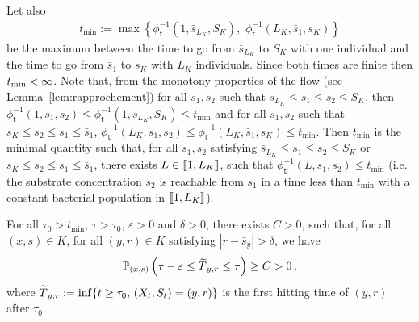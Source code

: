\documentclass[AHL,Unicode,longabstracts,published]{cedram}
\newcommand{\llbracket}{\mathopen{[\mkern -2.7mu[}}
\newcommand{\rrbracket}{\mathclose{]\mkern -2.7mu]}}
\newcommand{\PP}{\mathbb{P}}
\newcommand{\SminK}{s_K}
\newcommand{\SmaxK}{S_K}
\newcommand{\phit}{\phi_\textsf{t}^{-1}}
\newcommand{\lmax}{{L_K}}
\newcommand{\setunlmax}{\llbracket 1, \lmax\rrbracket}
\newcommand{\1}{\mathbf{1}}
\let\oldtilde\tilde
\renewcommand*{\tilde}[1]{\mathchoice{\widetilde{#1}}{\widetilde{#1}}{\oldtilde{#1}}{\oldtilde{#1}}}
\begin{document}
Let also
\begin{align}\label{def:tmin}
t_{\min}:= \max\left\{\phit\left(1,\bar s_{\lmax},\SmaxK\right),\, \,\phit\left(\lmax,\bar s_1,\SminK\right)\right\}
\end{align}
be the maximum between the time to go from $\bar s_{\lmax}$ to $\SmaxK$ with one individual and the time to go from $\bar s_1$ to $\SminK$ with $\lmax$ individuals. Since both times are finite then $t_{\min}\linebreak<\infty$. Note that, from the monotony properties of the flow (see Lemma~\ref{lem:rapprochement}) for all $s_1,s_2$ such that $\bar s_{\lmax}\leq s_1\leq s_2\leq \SmaxK$, then $\phit(1,s_1,s_2)\leq \phit(1,\bar s_{\lmax},\SmaxK) \leq t_{\min}$ and for all $s_1,s_2$ such that $\SminK\leq s_2\leq s_1\leq \bar s_1$, $\phit(\lmax,s_1,s_2)\leq \phit(\lmax,\bar s_1,\SminK)\leq t_{\min}$. Then $t_{\min}$ is the minimal quantity such that, for all $s_1, s_2$ satisfying $\bar s_{\lmax}\leq s_1\leq s_2\leq \SmaxK$ or $\SminK\leq s_2\leq s_1\leq \bar s_1$, there exists $L\in \setunlmax$, such that $\phit(L,s_1,s_2)\leq t_{\min}$ (i.e. the substrate concentration $s_2$ is reachable from $s_1$ in a time less than $t_{\min}$ with a constant bacterial population in $\setunlmax$).


\begin{prop}\label{prop.partout.a.partout}
For all $\tau_0>t_{\min}$, $\tau>\tau_0$, $\varepsilon>0$ and $\delta>0$, there exists $C>0$, such that, for all $(x,s)\in K$, for all $(y,r)\in K$ satisfying $|r-\bar s_y|>\delta$, we have
\[
\PP_{(x,s)}\left(\tau-\varepsilon \leq \tilde T_{y,r} \leq \tau\right)\geq C>0\,,
\]
where $\tilde T_{y,r}:= \inf\{t\geq \tau_0,\, (X_t,S_t)=(y,r)\}$ is the first hitting time of $(y,r)$ after $\tau_0$.
\end{prop}
\end{document}
